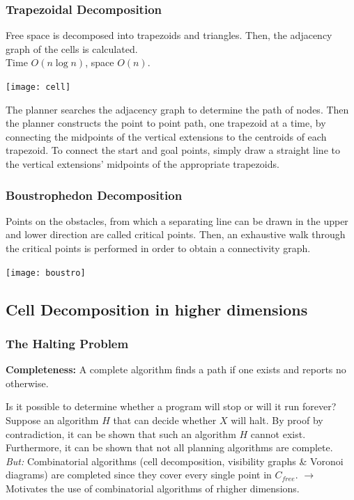 \begin{multicols*}{2}
\subsubsection{Trapezoidal Decomposition}
Free space is decomposed into trapezoids and triangles. Then, the adjacency graph of the cells is calculated.\\
Time $O(n \log n)$, space $O(n)$.

\begin{center}
\texttt{[image: cell]}
\end{center}

\noindent The planner searches the adjacency graph to determine the path of nodes.
Then the planner constructs the point to point path, one trapezoid at a time, by connecting the midpoints of the vertical extensions to the centroids of each trapezoid.
To connect the start and goal points, simply draw a straight line to the vertical extensions’ midpoints of the appropriate trapezoids.

\subsubsection{Boustrophedon Decomposition}
Points on the obstacles, from which a separating line can be drawn in the upper and lower direction are called critical points. Then, an exhaustive walk through the critical points is performed in order to obtain a connectivity graph.
\begin{center}
\texttt{[image: boustro]}
\end{center}

\subsection{Cell Decomposition in higher dimensions}
\subsubsection{The Halting Problem}
\textbf{Completeness:} A complete algorithm finds a path if one exists and reports no otherwise.\par
Is it possible to determine whether a program will stop or will it run forever?\\
Suppose an algorithm $H$ that can decide whether $X$ will halt.
By proof by contradiction, it can be shown that such an algorithm $H$ cannot exist.
Furthermore, it can be shown that not all planning algorithms are complete.\\
\textit{But:} Combinatorial algorithms (cell decomposition, visibility graphs \& Voronoi diagrams) are completed since they cover every single point in $C_{free}$. $\rightarrow$ Motivates the use of combinatorial algorithms of rhigher dimensions.


\end{multicols*}
